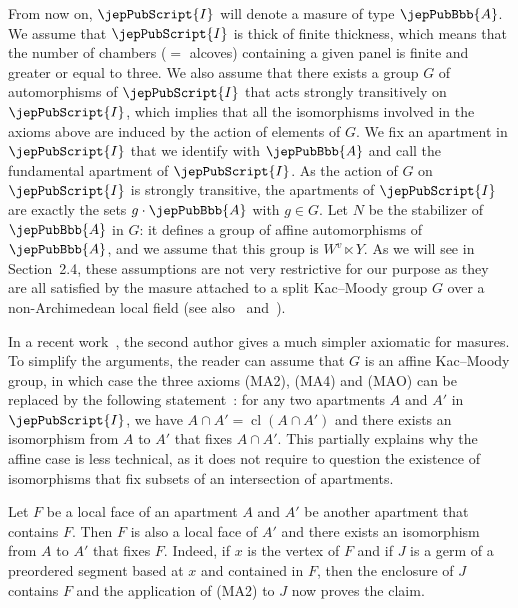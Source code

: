 From now on, $\jepPubScript{I}$ will denote a masure of type $\jepPubBbb{A}$. We assume that $\jepPubScript{I}$ is thick of finite thickness, which means that the number of chambers ($=$ alcoves) containing a given panel is finite and greater or equal to three. We also assume that there exists a group $G$ of automorphisms of $\jepPubScript{I}$ that acts strongly transitively on $\jepPubScript{I}$, which implies that all the isomorphisms involved in the axioms above are induced by the action of elements of $G$. We fix an apartment in $\jepPubScript{I}$ that we identify with $\jepPubBbb{A}$ and call the fundamental apartment of $\jepPubScript{I}$. As the action of $G$ on $\jepPubScript{I}$ is strongly transitive, the apartments of $\jepPubScript{I}$ are exactly the sets $g\cdot\jepPubBbb{A}$ with $g\in G$. Let $N$ be the stabilizer of $\jepPubBbb{A}$ in $G$: it defines a group of affine automorphisms of $\jepPubBbb{A}$, and we assume that this group is $W^v\ltimes Y$. As we will see in Section~2.4, these assumptions are not very restrictive for our purpose as they are all satisfied by the masure attached to a split Kac--Moody group $G$ over a non-Archimedean local field (see also~\cite{jep88refGR08} and~\cite{jep88refRou16}).
\begin{remark}\label{jep88localRemark2_5}
In a recent work~\cite[\S5]{jep88refHeb17a}, the second author gives a much simpler axiomatic for masures. To simplify the arguments, the reader can assume that $G$ is an affine Kac--Moody group, in which case the three axioms (MA2), (MA4) and (MAO) can be replaced by the following statement~\cite[Th.~5.38]{jep88refHeb17a}: for any two apartments $A$ and $A'$ in $\jepPubScript{I}$, we have $A\cap A'=\operatorname{cl}(A\cap A')$ and there exists an isomorphism from $A$ to $A'$ that fixes $A\cap A'$. This partially explains why the affine case is less technical, as it does not require to question the existence of isomorphisms that fix subsets of an intersection of apartments.
\end{remark}
\begin{remark}\label{jep88localRemark2_6}
Let $F$ be a local face of an apartment $A$ and $A'$ be another apartment that contains $F$. Then $F$ is also a local face of $A'$ and there exists an isomorphism from $A$ to $A'$ that fixes $F$. Indeed, if $x$ is the vertex of $F$ and if $J$ is a germ of a preordered segment based at $x$ and contained in $F$, then the enclosure of $J$ contains $F$ and the application of (MA2) to $J$ now proves the claim.
\end{remark}
